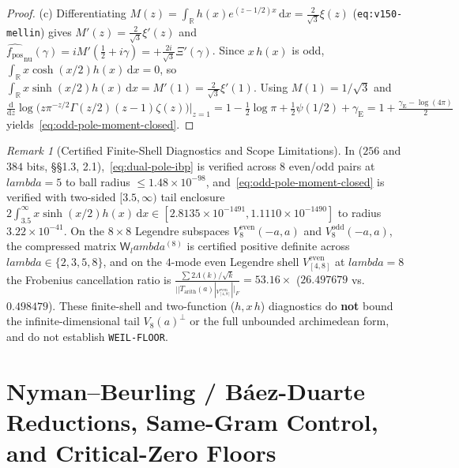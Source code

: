 \documentclass[11pt]{article}
\def\lambda{lambda}%
\def\norm#1{||#1||}%
\theoremstyle{remark}
\newtheorem{remark}[theorem]{Remark}
\newcommand{\norm}[1]{\left\lVert #1\right\rVert}
\newcommand{\dd}{\mathrm d}
\begin{document}
\begin{proof}
(c) Differentiating $M(z) = \int_{\mathbb{R}} h(x)e^{(z-1/2)x}\,\dd x = \frac{2}{\sqrt{3}}\xi(z)$ (\texttt{eq:v150-mellin}) gives $M'(z) = \frac{2}{\sqrt{3}}\xi'(z)$ and $\widehat{f_{\mathrm{pos}}}_{\mathrm{nu}}(\gamma) = iM'(\tfrac{1}{2} + i\gamma) = +\frac{2i}{\sqrt{3}}\Xi'(\gamma)$. Since $x\,h(x)$ is odd, $\int_{\mathbb{R}} x\cosh(x/2)h(x)\,\dd x = 0$, so $\int_{\mathbb{R}} x\sinh(x/2)h(x)\,\dd x = M'(1) = \frac{2}{\sqrt{3}}\xi'(1)$. Using $M(1) = 1/\sqrt{3}$ and $\frac{\dd}{\dd z}\log\bigl(z\pi^{-z/2}\Gamma(z/2)(z-1)\zeta(z)\bigr)\big|_{z=1} = 1 - \tfrac{1}{2}\log\pi + \tfrac{1}{2}\psi(1/2) + \gamma_{\mathrm{E}} = 1 + \frac{\gamma_{\mathrm{E}} - \log(4\pi)}{2}$ yields~\eqref{eq:odd-pole-moment-closed}.
\end{proof}

\begin{remark}[Certified Finite-Shell Diagnostics and Scope Limitations]
In  ($256$ and $384$ bits,  \S\S1.3, 2.1),~\eqref{eq:dual-pole-ibp} is verified across $8$ even/odd pairs at $\lambda = 5$ to ball radius $\le 1.48 \times 10^{-98}$, and~\eqref{eq:odd-pole-moment-closed} is verified with two-sided $[3.5,\infty)$ tail enclosure $2\int_{3.5}^\infty x\sinh(x/2)h(x)\,\dd x \in [2.8135\times 10^{-1491}, 1.1110\times 10^{-1490}]$ to radius $3.22 \times 10^{-41}$. On the $8\times 8$ Legendre subspaces $V_8^{\mathrm{even}}(-a,a)$ and $V_8^{\mathrm{odd}}(-a,a)$, the compressed matrix $\mathsf{W}_\lambda^{(8)}$ is certified positive definite across $\lambda \in \{2,3,5,8\}$, and on the $4$-mode even Legendre shell $V_{[4,8]}^{\mathrm{even}}$ at $\lambda = 8$ the Frobenius cancellation ratio is $\frac{\sum 2\Lambda(k)/\sqrt{k}}{\norm{T_{\mathrm{arith}}(a)|_{V_{[4,8]}^{\mathrm{even}}}}_F} = 53.16\times$ ($26.497679$ vs.\ $0.498479$). These finite-shell and two-function ($h, x\,h$) diagnostics do \textbf{not} bound the infinite-dimensional tail $V_8(a)^\perp$ or the full unbounded archimedean form, and do not establish \texttt{WEIL-FLOOR}.
\end{remark}

\section{Nyman--Beurling / B\'aez-Duarte Reductions, Same-Gram Control, and Critical-Zero Floors}
\label{sec:nb}
\end{document}
